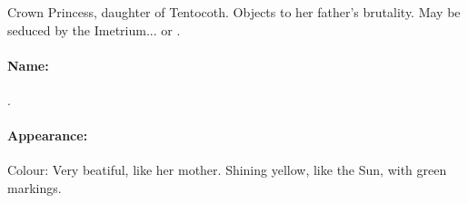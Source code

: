 \begin{comment}
\subsectionn{\Ishnaruchyfir}
Ishnaruchyfir is an old, venerable \dragon{} warrior, \dragonlord{} of the Bloodline Brannocthur and one of the most powerful nobles in Irokas. Not only is he the father of Queen Drinzethel, he is also of royal blood, being the cousin of King Noreocchyrias (his mother was the daughter of a reigning Queen). He is King Tentocoth's most trusted and loyal supporter. 

Above all else, Ishnaruchyfir is loyal to the traditions of Irokas. He is highly conservative and resists change. Among other things, he greatly resents skekrathuin\footnote{Skekrathuin are a \draconic{} weapon, the equivalent of swords. They are large metal blades worn on the arms and tail. Usually, skekrathuin are strapped onto the arm, but sometimes they are held in the hand. Most skekrathuin are single-edged and meant for swiping outward.} and refuses to use them. He also refuses to wear any kind of armor or clothes and walks fiercely naked at all times (except, sometimes, for a flag with the blazon of his Bloodline, flying from his horn). 

\paragraph{Name:}
\pronun{\Ishnaruchyfir}{EESH-naa-roo-'chaj-feer}, \dragonlord{} of the \pronun{Brannocthur}{BR�N-nok-thoor} Bloodline. 

\paragraph{Appearance:}
Not very long, but very massive and heavy. He is coloured in black and red. 

He has a single backward-pointing horn on his forehead. 
\end{comment}



Crown Princess, daughter of Tentocoth. Objects to her father's brutality. May be seduced by the Imetrium... or \NerrhanKoss. 

\paragraph{Name:}
.

\paragraph{Appearance:}
Colour: Very beatiful, like her mother. Shining yellow, like the Sun, with green markings. 




